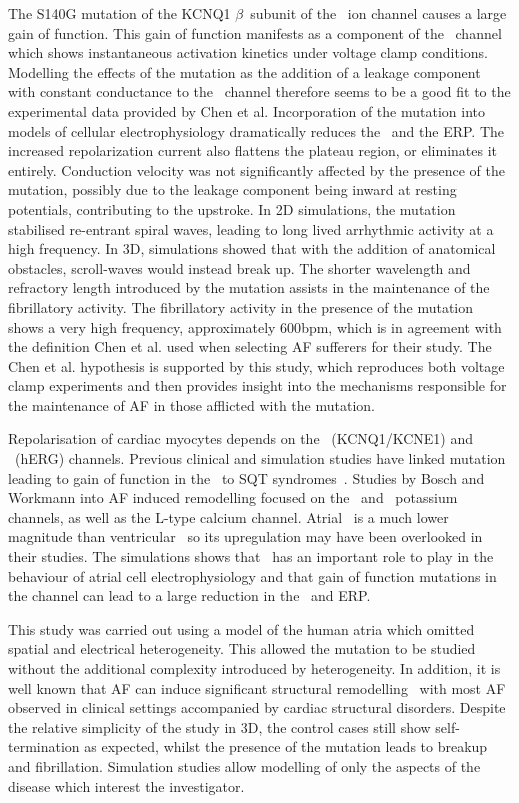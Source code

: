 The S140G mutation of the KCNQ1 $\beta$\ subunit of the \ ion channel
causes a large gain of function.
This gain of function manifests as a component of the \ channel which
shows instantaneous activation kinetics under voltage clamp conditions.
Modelling the effects of the mutation as the addition of a leakage component
with constant conductance to the \ channel therefore seems to be a good
fit to the experimental data provided by Chen et al.
Incorporation of the mutation into models of cellular electrophysiology
dramatically reduces the \apd\ and the ERP.
The increased repolarization current also flattens the plateau region, or
eliminates it entirely.
Conduction velocity was not significantly affected by the presence of the
mutation, possibly due to the leakage component being inward at resting
potentials, contributing to the upstroke.
In 2D simulations, the mutation stabilised re-entrant spiral waves, leading to
long lived arrhythmic activity at a high frequency.
In 3D, simulations showed that with the addition of anatomical obstacles,
scroll-waves would instead break up.
The shorter wavelength and refractory length introduced by the mutation assists
in the maintenance of the fibrillatory activity.
The fibrillatory activity in the presence of the mutation shows a very high
frequency, approximately \unit{600}{bpm}, which is in agreement with the
definition Chen et al. used when selecting AF sufferers for their study.
The Chen et al. hypothesis is supported by this study, which reproduces both
voltage clamp experiments and then provides insight into the mechanisms
responsible for the maintenance of AF in those afflicted with the mutation.

Repolarisation of cardiac myocytes depends on the \ (KCNQ1/KCNE1) and
\ (hERG) channels.
Previous clinical and simulation studies have linked mutation leading to
gain of function in the \ to SQT syndromes~\cite{Brugada2004,Hong2005}.
Studies by Bosch and Workmann into AF induced remodelling focused on the
\ and \ potassium channels, as well as the L-type calcium channel.
Atrial \ is a much lower magnitude than ventricular \ so its
upregulation may have been overlooked in their studies.
The simulations shows that \ has an important role to play in the behaviour
of atrial cell electrophysiology and that gain of function mutations in the
channel can lead to a large reduction in the \apd\ and ERP.

This study was carried out using a model of the human atria which omitted
spatial and electrical heterogeneity.
This allowed the mutation to be studied without the additional complexity
introduced by heterogeneity.
In addition, it is well known that AF can induce significant structural
remodelling~\cite{Goette2002,Avitall2008} with most AF observed in clinical settings accompanied by cardiac
structural disorders.
Despite the relative simplicity of the study in 3D, the control cases still show
self-termination as expected, whilst the presence of the mutation leads to
breakup and fibrillation.
Simulation studies allow modelling of only the aspects of the disease which
interest the investigator.

